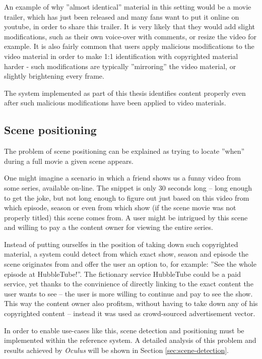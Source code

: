An example of why ''almost identical'' material in this setting would be a movie trailer, which has just been released and many fans want to put it online on youtube, in order to share this trailer. It is very likely that they would add slight modifications, such as their own voice-over with comments, or resize the video for example. It is also fairly common that users apply malicious modifications to the video material in order to make 1:1 identification with copyrighted material harder - such modifications are typically ''mirroring'' the video material, or slightly brightening every frame. 

The system implemented as part of this thesis identifies content properly even after such malicious modifications have been applied to video materials.


\subsection{Scene positioning}
\label{sec:goal-sub-movie}
The problem of scene positioning can be explained as trying to locate ''when'' during a full movie a given scene appears.

One might imagine a scenario in which a friend shows us a funny video from some series, available on-line. The snippet is only 30 seconds long -- long enough to get the joke, but not long enough to figure out just based on this video from which episode, season or even from which show (if the scene movie was not properly titled) this scene comes from. A user might be intrigued by this scene and willing to pay a the content owner for viewing the entire series. 

Instead of putting ourselfes in the position of taking down such copyrighted material, a system could detect from which exact show, season and episode the scene originates from and offer the user an option to, for example: ''See the whole episode at HubbleTube!''. The fictionary service HubbleTube could be a paid service, yet thanks to the convinience of directly linking to the exact content the user wants to see -- the user is more willing to continue and pay to see the show. This way the content owner also profitsm, without having to take down any of his copyrighted content -- instead it was used as crowd-sourced advertisement vector.

In order to enable use-cases like this, scene detection and positioning must be implemented within the reference system. A detailed analysis of this problem and results achieved by \textit{Oculus} will be shown in Section \ref{sec:scene-detection}.



